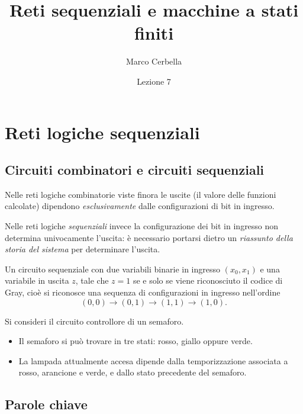 \documentclass[11pt,a4paper]{article}
\title{Reti sequenziali e macchine a stati finiti}
\author{Marco Cerbella}
\date{Lezione 7}
\begin{document}
\maketitle

\section{Reti logiche sequenziali}

\subsection{Circuiti combinatori e circuiti sequenziali}

Nelle reti logiche combinatorie viste finora le uscite (il valore delle funzioni calcolate) dipendono \emph{esclusivamente} dalle configurazioni di bit in ingresso.

Nelle reti logiche \emph{sequenziali} invece la configurazione dei bit in ingresso non determina univocamente l'uscita: è necessario portarsi dietro un \emph{riassunto della storia del sistema} per determinare l'uscita.

\begin{esempio}
Un circuito sequenziale con due variabili binarie in ingresso $(x_0, x_1)$ e una variabile in uscita $z$, tale che $z = 1$ se e solo se viene riconosciuto il codice di Gray, cioè si riconosce una sequenza di configurazioni in ingresso nell'ordine
\[
(0,0) \to (0,1) \to (1,1) \to (1,0).
\]
\end{esempio}

\begin{esempio}[Il semaforo]
Si consideri il circuito controllore di un semaforo.
\begin{itemize}
    \item Il semaforo si può trovare in tre stati: rosso, giallo oppure verde.
    \item La lampada attualmente accesa dipende dalla temporizzazione associata a rosso, arancione e verde, e dallo stato precedente del semaforo.
\end{itemize}
\end{esempio}

\subsection{Parole chiave}
\end{document}

